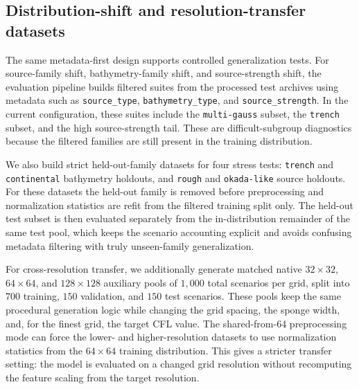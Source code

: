 \subsection{Distribution-shift and resolution-transfer datasets}
\label{subsec:shift-resolution-data}

The same metadata-first design supports controlled generalization tests. For source-family shift, bathymetry-family shift, and source-strength shift, the evaluation pipeline builds filtered suites from the processed test archives using metadata such as \texttt{source\_type}, \texttt{bathymetry\_type}, and \texttt{source\_strength}. In the current configuration, these suites include the \texttt{multi-gauss} subset, the \texttt{trench} subset, and the high source-strength tail. These are difficult-subgroup diagnostics because the filtered families are still present in the training distribution.

We also build strict held-out-family datasets for four stress tests: \texttt{trench} and \texttt{continental} bathymetry holdouts, and \texttt{rough} and \texttt{okada-like} source holdouts. For these datasets the held-out family is removed before preprocessing and normalization statistics are refit from the filtered training split only. The held-out test subset is then evaluated separately from the in-distribution remainder of the same test pool, which keeps the scenario accounting explicit and avoids confusing metadata filtering with truly unseen-family generalization.

For cross-resolution transfer, we additionally generate matched native $32 \times 32$, $64 \times 64$, and $128 \times 128$ auxiliary pools of $1{,}000$ total scenarios per grid, split into $700$ training, $150$ validation, and $150$ test scenarios. These pools keep the same procedural generation logic while changing the grid spacing, the sponge width, and, for the finest grid, the target CFL value. The shared-from-$64$ preprocessing mode can force the lower- and higher-resolution datasets to use normalization statistics from the $64 \times 64$ training distribution. This gives a stricter transfer setting: the model is evaluated on a changed grid resolution without recomputing the feature scaling from the target resolution.
